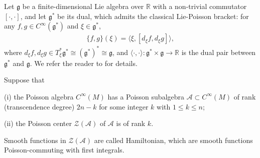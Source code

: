 \documentclass[11pt]{amsart}
\theoremstyle{definition}
\theoremstyle{plain}
\theoremstyle{conclusion}
\begin{document}
Let $\mathfrak{g}$ be a finite-dimensional Lie algebra over $\mathbb{R}$ with a non-trivial commutator $[\cdot,\cdot]$, and let $\mathfrak{g}^*$ be its dual, which admits the classical Lie-Poisson bracket: for any $f,g \in C^\infty(\mathfrak{g}^*)$ and $\xi \in \mathfrak{g}^*$, 
\begin{align}
    \{f,g\} (\xi)  = \langle \xi, [d_\xi f,d_\xi g]  \rangle ,\label{eq:poiss}
\end{align} 
where $d_\xi f, d_\xi g \in  T_\xi^*\mathfrak{g}^*\cong \left(\mathfrak{g}^*\right)^* \cong \mathfrak{g}$, and $\langle \cdot,\cdot \rangle : \mathfrak{g}^*\times \mathfrak{g} \rightarrow \mathbb{R}$ is the dual pair between $\mathfrak{g}^*$ and $\mathfrak{g}$. We refer the reader to  \cite[Chapter 7]{MR2906391} for details. 










Suppose that

(i) the Poisson algebra $C^\infty(M)$  has a Poisson subalgebra $\mathcal{A} \subset C^\infty(M)$ of rank (transcendence degree) $2n-k$ for some integer $k$ with $1\leqslant k\leqslant n$;

(ii) the Poisson center $\mathcal{Z}(\mathcal{A})$ of $ \mathcal{A}$ is of rank $k$. 


Smooth functions in $\mathcal{Z}(\mathcal{A})$ are called Hamiltonian, which are smooth functions Poisson-commuting with first integrals. %
\end{document}

